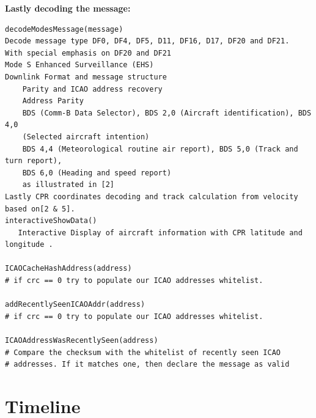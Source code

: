 \documentclass[11pt,a4paper]{report}
\begin{document}
\textbf{Lastly decoding the message:}
\begin{verbatim}
decodeModesMessage(message)
Decode message type DF0, DF4, DF5, D11, DF16, D17, DF20 and DF21.
With special emphasis on DF20 and DF21
Mode S Enhanced Surveillance (EHS)
Downlink Format and message structure
    Parity and ICAO address recovery
    Address Parity
    BDS (Comm-B Data Selector), BDS 2,0 (Aircraft identification), BDS 4,0 
    (Selected aircraft intention)
    BDS 4,4 (Meteorological routine air report), BDS 5,0 (Track and turn report),  
    BDS 6,0 (Heading and speed report)
    as illustrated in [2]
Lastly CPR coordinates decoding and track calculation from velocity based on[2 & 5].
interactiveShowData()
   Interactive Display of aircraft information with CPR latitude and longitude .	
    
ICAOCacheHashAddress(address)
# if crc == 0 try to populate our ICAO addresses whitelist.

addRecentlySeenICAOAddr(address)
# if crc == 0 try to populate our ICAO addresses whitelist.

ICAOAddressWasRecentlySeen(address)
# Compare the checksum with the whitelist of recently seen ICAO
# addresses. If it matches one, then declare the message as valid
\end{verbatim}


\section{Timeline}
\end{document}
